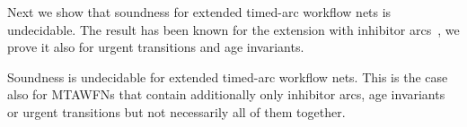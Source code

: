 
Next we show that soundness for extended timed-arc workflow nets
is undecidable.
The result has been 
known for the extension with inhibitor arcs~\cite{AalstHHSVVW11}, we prove it 
also for urgent transitions and age invariants. 


\begin{theorem}\label{thm:undecid}
Soundness is undecidable for extended timed-arc workflow nets.
This is the case also for MTAWFNs that contain additionally only
inhibitor arcs, age invariants or urgent transitions but not necessarily
all of them together.
\end{theorem}

